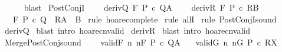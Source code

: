 \begin{isabellebody}
\ \ \ \ \isamarkupfalse%
\ blast\isanewline
{}\isamarkupfalse%
%
\endisatagproof
{\isafoldproof}%
%
\isadelimproof
\isanewline
%
\endisadelimproof
\isanewline
{}\isamarkupfalse%
\ PostConjI{\isacharcolon}\ \isanewline
\ \ \ deriv{\isacharunderscore}Q{\isacharcolon}\ {\isachardoublequoteopen}{\isasymGamma}{\isacharcomma}{\isasymTheta}{\isasymturnstile}\isactrlbsub {\isacharslash}F\isactrlesub \ P\ c\ Q{\isacharcomma}A{\isachardoublequoteclose}\ \isanewline
\ \ \ deriv{\isacharunderscore}R{\isacharcolon}\ {\isachardoublequoteopen}{\isasymGamma}{\isacharcomma}{\isasymTheta}{\isasymturnstile}\isactrlbsub {\isacharslash}F\isactrlesub \ P\ c\ R{\isacharcomma}B{\isachardoublequoteclose}\isanewline
\ \ \ {\isachardoublequoteopen}{\isasymGamma}{\isacharcomma}{\isasymTheta}{\isasymturnstile}\isactrlbsub {\isacharslash}F\isactrlesub \ P\ c\ {\isacharparenleft}Q\ {\isasyminter}\ R{\isacharparenright}{\isacharcomma}{\isacharparenleft}A\ {\isasyminter}\ B{\isacharparenright}{\isachardoublequoteclose}\isanewline
%
\isadelimproof
%
\endisadelimproof
%
\isatagproof
{}\isamarkupfalse%
\ {\isacharparenleft}rule\ hoare{\isacharunderscore}complete{\isacharprime}{\isacharparenright}\isanewline
{}\isamarkupfalse%
\ {\isacharparenleft}rule\ allI{\isacharparenright}\isanewline
{}\isamarkupfalse%
\ {\isacharparenleft}rule\ PostConjI{\isacharunderscore}sound{\isacharparenright}\isanewline
{}\isamarkupfalse%
\ deriv{\isacharunderscore}Q\isanewline
{}\isamarkupfalse%
\ {\isacharparenleft}blast\ intro{\isacharcolon}\ hoare{\isacharunderscore}cnvalid{\isacharparenright}\isanewline
{}\isamarkupfalse%
\ deriv{\isacharunderscore}R\isanewline
{}\isamarkupfalse%
\ {\isacharparenleft}blast\ intro{\isacharcolon}\ hoare{\isacharunderscore}cnvalid{\isacharparenright}\isanewline
{}\isamarkupfalse%
%
\endisatagproof
{\isafoldproof}%
%
\isadelimproof
\isanewline
%
\endisadelimproof
\isanewline
{}\isamarkupfalse%
\ Merge{\isacharunderscore}PostConj{\isacharunderscore}sound{\isacharcolon}\ \isanewline
\ \ \ validF{\isacharcolon}\ {\isachardoublequoteopen}{\isasymforall}n{\isachardot}\ {\isasymGamma}{\isacharcomma}{\isasymTheta}{\isasymTurnstile}n{\isacharcolon}\isactrlbsub {\isacharslash}F\isactrlesub \ P\ c\ Q{\isacharcomma}A{\isachardoublequoteclose}\isanewline
\ \ \ validG{\isacharcolon}\ {\isachardoublequoteopen}{\isasymforall}n{\isachardot}\ {\isasymGamma}{\isacharcomma}{\isasymTheta}{\isasymTurnstile}n{\isacharcolon}\isactrlbsub {\isacharslash}G\isactrlesub \ P{\isacharprime}\ c\ R{\isacharcomma}X{\isachardoublequoteclose}\isanewline

\end{isabellebody}
